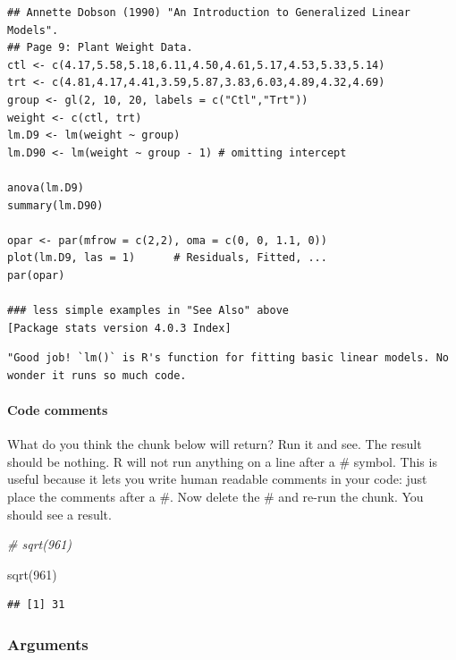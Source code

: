 \documentclass[
]{article}
\newenvironment{Shaded}{\begin{snugshade}}{\end{snugshade}}
\newcommand{\CommentTok}[1]{\textcolor[rgb]{0.56,0.35,0.01}{\textit{#1}}}
\newcommand{\DecValTok}[1]{\textcolor[rgb]{0.00,0.00,0.81}{#1}}
\newcommand{\FunctionTok}[1]{\textcolor[rgb]{0.00,0.00,0.00}{#1}}
\newcommand{\NormalTok}[1]{#1}
\begin{document}
\begin{verbatim}
## Annette Dobson (1990) "An Introduction to Generalized Linear Models".
## Page 9: Plant Weight Data.
ctl <- c(4.17,5.58,5.18,6.11,4.50,4.61,5.17,4.53,5.33,5.14)
trt <- c(4.81,4.17,4.41,3.59,5.87,3.83,6.03,4.89,4.32,4.69)
group <- gl(2, 10, 20, labels = c("Ctl","Trt"))
weight <- c(ctl, trt)
lm.D9 <- lm(weight ~ group)
lm.D90 <- lm(weight ~ group - 1) # omitting intercept

anova(lm.D9)
summary(lm.D90)

opar <- par(mfrow = c(2,2), oma = c(0, 0, 1.1, 0))
plot(lm.D9, las = 1)      # Residuals, Fitted, ...
par(opar)

### less simple examples in "See Also" above
[Package stats version 4.0.3 Index]
\end{verbatim}

\begin{verbatim}
"Good job! `lm()` is R's function for fitting basic linear models. No wonder it runs so much code.
\end{verbatim}

\hypertarget{code-comments}{%
\paragraph{Code comments}\label{code-comments}}

What do you think the chunk below will return? Run it and see. The
result should be nothing. R will not run anything on a line after a \#
symbol. This is useful because it lets you write human readable comments
in your code: just place the comments after a \#. Now delete the \# and
re-run the chunk. You should see a result.

\begin{Shaded}
\begin{Highlighting}[]
\CommentTok{\# sqrt(961)}
\end{Highlighting}
\end{Shaded}

\begin{Shaded}
\begin{Highlighting}[]
\FunctionTok{sqrt}\NormalTok{(}\DecValTok{961}\NormalTok{)}
\end{Highlighting}
\end{Shaded}

\begin{verbatim}
## [1] 31
\end{verbatim}

\hypertarget{arguments}{%
\subsubsection{Arguments}\label{arguments}}
\end{document}
